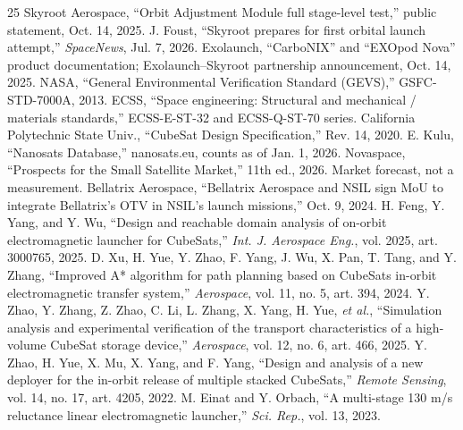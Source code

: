 \documentclass[conference]{IEEEtran}
\begin{document}
\begin{thebibliography}{25}
 Skyroot Aerospace, ``Orbit Adjustment Module full stage-level test,'' public statement, Oct. 14, 2025.
 J. Foust, ``Skyroot prepares for first orbital launch attempt,'' \emph{SpaceNews}, Jul. 7, 2026.
 Exolaunch, ``CarboNIX'' and ``EXOpod Nova'' product documentation; Exolaunch--Skyroot partnership announcement, Oct. 14, 2025.
 NASA, ``General Environmental Verification Standard (GEVS),'' GSFC-STD-7000A, 2013.
 ECSS, ``Space engineering: Structural and mechanical / materials standards,'' ECSS-E-ST-32 and ECSS-Q-ST-70 series.
 California Polytechnic State Univ., ``CubeSat Design Specification,'' Rev. 14, 2020.
 E. Kulu, ``Nanosats Database,'' nanosats.eu, counts as of Jan. 1, 2026.
 Novaspace, ``Prospects for the Small Satellite Market,'' 11th ed., 2026. Market forecast, not a measurement.
 Bellatrix Aerospace, ``Bellatrix Aerospace and NSIL sign MoU to integrate Bellatrix's OTV in NSIL's launch missions,'' Oct. 9, 2024.
 H. Feng, Y. Yang, and Y. Wu, ``Design and reachable domain analysis of on-orbit electromagnetic launcher for CubeSats,'' \emph{Int. J. Aerospace Eng.}, vol. 2025, art. 3000765, 2025.
 D. Xu, H. Yue, Y. Zhao, F. Yang, J. Wu, X. Pan, T. Tang, and Y. Zhang, ``Improved A* algorithm for path planning based on CubeSats in-orbit electromagnetic transfer system,'' \emph{Aerospace}, vol. 11, no. 5, art. 394, 2024.
 Y. Zhao, Y. Zhang, Z. Zhao, C. Li, L. Zhang, X. Yang, H. Yue, \emph{et al.}, ``Simulation analysis and experimental verification of the transport characteristics of a high-volume CubeSat storage device,'' \emph{Aerospace}, vol. 12, no. 6, art. 466, 2025.
 Y. Zhao, H. Yue, X. Mu, X. Yang, and F. Yang, ``Design and analysis of a new deployer for the in-orbit release of multiple stacked CubeSats,'' \emph{Remote Sensing}, vol. 14, no. 17, art. 4205, 2022.
 M. Einat and Y. Orbach, ``A multi-stage 130 m/s reluctance linear electromagnetic launcher,'' \emph{Sci. Rep.}, vol. 13, 2023.
\end{thebibliography}
\end{document}
